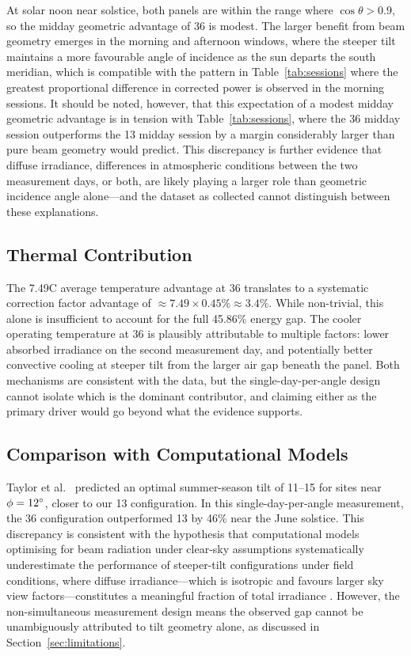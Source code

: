 \documentclass[conference]{IEEEtran}
\begin{document}
At solar noon near solstice, both panels are within the range where $\cos\theta > 0.9$, so
the midday geometric advantage of 36\degree{} is modest. The larger benefit from beam
geometry emerges in the morning and afternoon windows, where the steeper tilt maintains a
more favourable angle of incidence as the sun departs the south meridian, which is compatible
with the pattern in Table~\ref{tab:sessions} where the greatest proportional difference in
corrected power is observed in the morning sessions. It should be noted, however, that this
expectation of a modest midday geometric advantage is in tension with Table~\ref{tab:sessions},
where the 36\degree{} midday session outperforms the 13\degree{} midday session by a margin
considerably larger than pure beam geometry would predict. This discrepancy is further
evidence that diffuse irradiance, differences in atmospheric conditions between the two
measurement days, or both, are likely playing a larger role than geometric incidence angle
alone---and the dataset as collected cannot distinguish between these explanations.

\subsection{Thermal Contribution}

The 7.49\degree{}C average temperature advantage at 36\degree{} translates to a systematic
correction factor advantage of $\approx 7.49 \times 0.45\% \approx 3.4\%$. While non-trivial,
this alone is insufficient to account for the full 45.86\% energy gap. The cooler operating
temperature at 36\degree{} is plausibly attributable to multiple factors: lower absorbed
irradiance on the second measurement day, and potentially better convective cooling at steeper
tilt from the larger air gap beneath the panel. Both mechanisms are consistent with the data,
but the single-day-per-angle design cannot isolate which is the dominant contributor, and
claiming either as the primary driver would go beyond what the evidence supports.

\subsection{Comparison with Computational Models}

Taylor et al.\ \cite{taylor2022} predicted an optimal summer-season tilt of 11\degree{}--15\degree{}
for sites near $\phi = 12\degree{}$, closer to our 13\degree{} configuration. In this
single-day-per-angle measurement, the 36\degree{} configuration outperformed 13\degree{} by
46\% near the June solstice. This discrepancy is consistent with the hypothesis that
computational models optimising for beam radiation under clear-sky assumptions
systematically underestimate the performance of steeper-tilt configurations under field
conditions, where diffuse irradiance---which is isotropic and favours larger sky view
factors---constitutes a meaningful fraction of total irradiance \cite{perez1990}. However,
the non-simultaneous measurement design means the observed gap cannot be unambiguously
attributed to tilt geometry alone, as discussed in Section~\ref{sec:limitations}.
\end{document}
